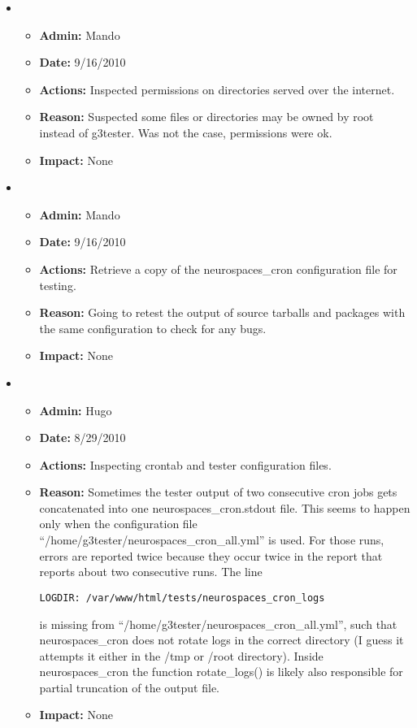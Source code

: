 \documentclass[12pt]{article}
\begin{document}
\begin{itemize}
\item
\begin{itemize}
\item[] {\bf Admin:} Mando
\item[] {\bf Date:} 9/16/2010 
\item[] {\bf Actions:} Inspected permissions on directories served over the internet.
\item[] {\bf Reason:} Suspected some files or directories may be owned by root instead of g3tester. Was not the case, permissions were ok.
\item[] {\bf Impact:} None
\end{itemize}

\item 
\begin{itemize}
\item[] {\bf Admin:} Mando
\item[] {\bf Date:} 9/16/2010 
\item[] {\bf Actions:} Retrieve a copy of the neurospaces\_cron configuration file for testing.
\item[] {\bf Reason:} Going to retest the output of source tarballs and packages with the same configuration to check for any bugs.
\item[] {\bf Impact:} None
\end{itemize}
	
\item 
\begin{itemize}
\item[] {\bf Admin:} Hugo
\item[] {\bf Date:} 8/29/2010 
\item[] {\bf Actions:} Inspecting crontab and tester configuration
  files.
\item[] {\bf Reason:} Sometimes the tester output of two consecutive
  cron jobs gets concatenated into one neurospaces\_cron.stdout file.
  This seems to happen only when the configuration file
  ``/home/g3tester/neurospaces\_cron\_all.yml'' is used.  For those
  runs, errors are reported twice because they occur twice in the
  report that reports about two consecutive runs.
  The line
\begin{verbatim}
LOGDIR: /var/www/html/tests/neurospaces_cron_logs
\end{verbatim}
  is missing from ``/home/g3tester/neurospaces\_cron\_all.yml'', such
  that neurospaces\_cron does not rotate logs in the correct directory
  (I guess it attempts it either in the /tmp or /root directory).
  Inside neurospaces\_cron the function rotate\_logs() is likely also
  responsible for partial truncation of the output file.
\item[] {\bf Impact:} None
\end{itemize}


\end{itemize}
\end{document}
